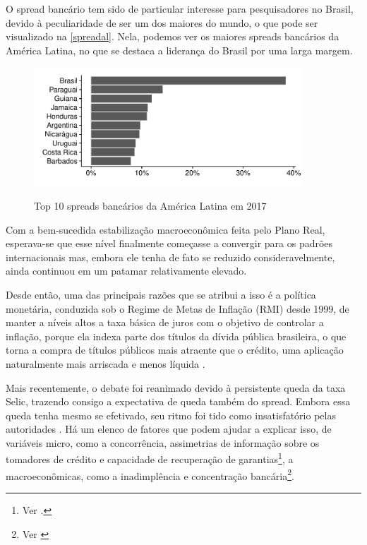 \documentclass[a4paper,
               article,
               12pt,
               openany,
               oneside,
               english,
               brazil]{abntex2}
\numberwithin{equation}{section}
\begin{document}
    O spread bancário tem sido de particular interesse para pesquisadores no Brasil, devido à peculiaridade de ser um dos maiores do mundo, o que pode ser visualizado na \autoref{spreadal}. Nela, podemos ver os maiores spreads bancários da América Latina, no que se destaca a liderança do Brasil por uma larga margem.

    \begin{figure}[h]
        \centering
        \caption{Top 10 spreads bancários da América Latina em 2017}
        \includegraphics[width = 0.9\textwidth, scale=1]{spread_AL.pdf}
        \label{spreadal}
    \end{figure}

    Com a bem-sucedida estabilização macroeconômica feita pelo Plano Real, esperava-se que esse nível finalmente começasse a convergir para os padrões internacionais mas, embora ele tenha de fato se reduzido consideravelmente, ainda continuou em um patamar relativamente elevado.

    Desde então, uma das principais razões que se atribui a isso é a política monetária, conduzida sob o Regime de Metas de Inflação (RMI) desde 1999, de manter a níveis altos a taxa básica de juros com o objetivo de controlar a inflação, porque ela indexa parte dos títulos da dívida pública brasileira, o que torna a compra de títulos públicos mais atraente que o crédito, uma aplicação naturalmente mais arriscada e menos líquida \cite[p.~7]{manhica12}.
    
    Mais recentemente, o debate foi reanimado devido à persistente queda da taxa Selic, trazendo consigo a expectativa de queda também do spread. Embora essa queda tenha mesmo se efetivado, seu ritmo foi tido como insatisfatório pelas autoridades \cite{valor1}. Há um elenco de fatores que podem ajudar a explicar isso, de variáveis micro, como a concorrência, assimetrias de informação sobre os tomadores de crédito e capacidade de recuperação de garantias\footnote{Ver \cite[p.~13]{reb2018}.}, a macroeconômicas, como a inadimplência e concentração bancária\footnote{Ver \cite{valor2}}.
    
\end{document}
